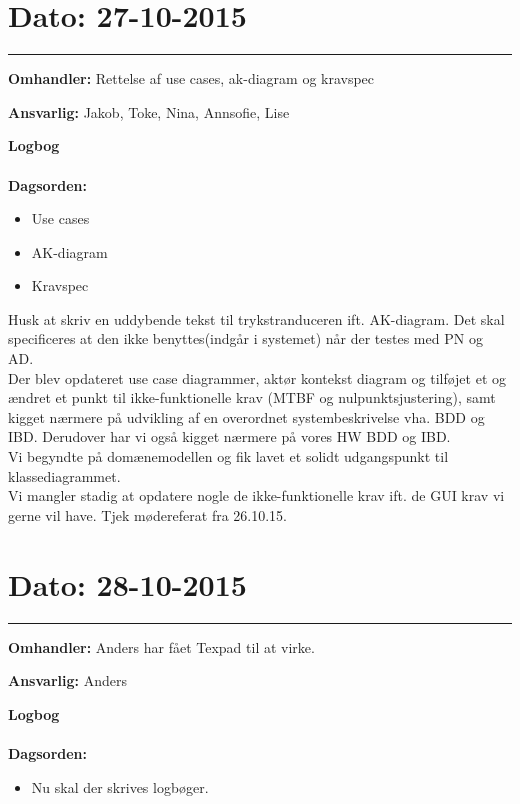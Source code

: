 	
	

\section{Dato: 27-10-2015 }
\hrule

\textbf{Omhandler:} Rettelse af use cases, ak-diagram og kravspec

\textbf{Ansvarlig:} Jakob, Toke, Nina, Annsofie, Lise 

\textbf{Logbog}
\\
\\
\textbf{Dagsorden:}
\begin{itemize}
	\item Use cases
	\item AK-diagram
	\item Kravspec
\end{itemize}

Husk at skriv en uddybende tekst til trykstranduceren ift. AK-diagram. Det skal specificeres at den ikke benyttes(indgår i systemet) når der testes med PN og AD.
\\
Der blev opdateret use case diagrammer, aktør kontekst diagram og tilføjet et og ændret et punkt til ikke-funktionelle krav (MTBF og nulpunktsjustering), samt kigget nærmere på udvikling af en overordnet systembeskrivelse vha. BDD og IBD. Derudover har vi også kigget nærmere på vores HW BDD og IBD.
\\
Vi begyndte på domænemodellen og fik lavet et solidt udgangspunkt til klassediagrammet. 
\\
Vi mangler stadig at opdatere nogle de ikke-funktionelle krav ift. de GUI krav vi gerne vil have. Tjek mødereferat fra 26.10.15.




\section{Dato: 28-10-2015 }
\hrule

\textbf{Omhandler:} Anders har fået Texpad til at virke. 

\textbf{Ansvarlig:} Anders
 
\textbf{Logbog}
\\
\\
\textbf{Dagsorden:}
\begin{itemize}
	\item Nu skal der skrives logbøger.
\end{itemize} 

